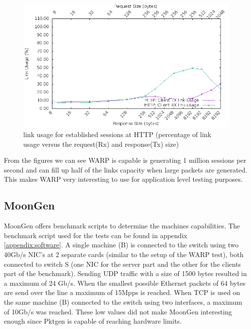 \begin{figure}[H]
  \includegraphics[scale=0.6]{images/http_link_usage.png}
  \caption{link usage for established sessions at HTTP  (percentage of link usage versus the request(Rx) and response(Tx) size)}
  \label{fig:httplink}
\end{figure}

From the figures we can see WARP is capable is generating 1 million sessions per second and can fill up half of the links capacity when large packets are generated.
This makes WARP very interesting to use for application level testing purposes. 

\subsection{MoonGen}
MoonGen offers benchmark scripts to determine the machines capabilities. 
The benchmark script used for the tests can be found in appendix \ref{appendix:software}. 
A single machine (B) is connected to the switch using two 40Gb/s NIC's at 2 separate cards (similar to the setup of the WARP test), both connected to switch S (one NIC for the server part and the other for the clients part of the benchmark). Sending UDP traffic with a size of 1500 bytes resulted in a maximum of 24 Gb/s. When the smallest possible Ethernet packets of 64 bytes are send over the line a maximum of 15Mpps is reached. When TCP is used on the same machine (B) connected to the switch using two interfaces, a maximum of 10Gb/s was reached. These low values did not make MoonGen interesting enough since Pktgen is capable of reaching hardware limits. 


